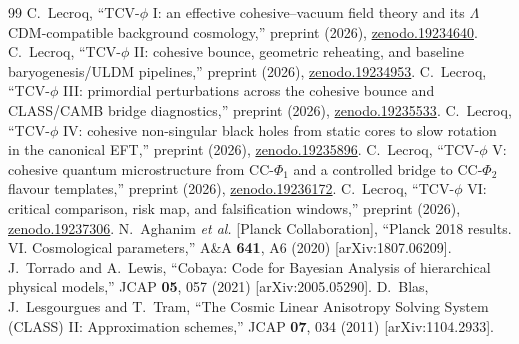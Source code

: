 \documentclass[aps,prd,onecolumn,nofootinbib,superscriptaddress]{revtex4-2}
\begin{document}
\begin{thebibliography}{99}
 C.~Lecroq, ``TCV-$\phi$ I: an effective cohesive--vacuum field theory and its $\Lambda$CDM-compatible background cosmology,'' preprint (2026), \href{https://doi.org/10.5281/zenodo.19234640}{zenodo.19234640}.
 C.~Lecroq, ``TCV-$\phi$ II: cohesive bounce, geometric reheating, and baseline baryogenesis/ULDM pipelines,'' preprint (2026), \href{https://doi.org/10.5281/zenodo.19234953}{zenodo.19234953}.
 C.~Lecroq, ``TCV-$\phi$ III: primordial perturbations across the cohesive bounce and CLASS/CAMB bridge diagnostics,'' preprint (2026), \href{https://doi.org/10.5281/zenodo.19235533}{zenodo.19235533}.
 C.~Lecroq, ``TCV-$\phi$ IV: cohesive non-singular black holes from static cores to slow rotation in the canonical EFT,'' preprint (2026), \href{https://doi.org/10.5281/zenodo.19235896}{zenodo.19235896}.
 C.~Lecroq, ``TCV-$\phi$ V: cohesive quantum microstructure from CC-$\Phi_1$ and a controlled bridge to CC-$\Phi_2$ flavour templates,'' preprint (2026), \href{https://doi.org/10.5281/zenodo.19236172}{zenodo.19236172}.
 C.~Lecroq, ``TCV-$\phi$ VI: critical comparison, risk map, and falsification windows,'' preprint (2026), \href{https://doi.org/10.5281/zenodo.19237306}{zenodo.19237306}.
N.~Aghanim \textit{et al.} [Planck Collaboration],
``Planck 2018 results. VI. Cosmological parameters,''
A\&A \textbf{641}, A6 (2020)
[arXiv:1807.06209].
J.~Torrado and A.~Lewis,
``Cobaya: Code for Bayesian Analysis of hierarchical physical models,''
JCAP \textbf{05}, 057 (2021)
[arXiv:2005.05290].
D.~Blas, J.~Lesgourgues and T.~Tram,
``The Cosmic Linear Anisotropy Solving System (CLASS) II: Approximation schemes,''
JCAP \textbf{07}, 034 (2011)
[arXiv:1104.2933].
\end{thebibliography}
\end{document}
